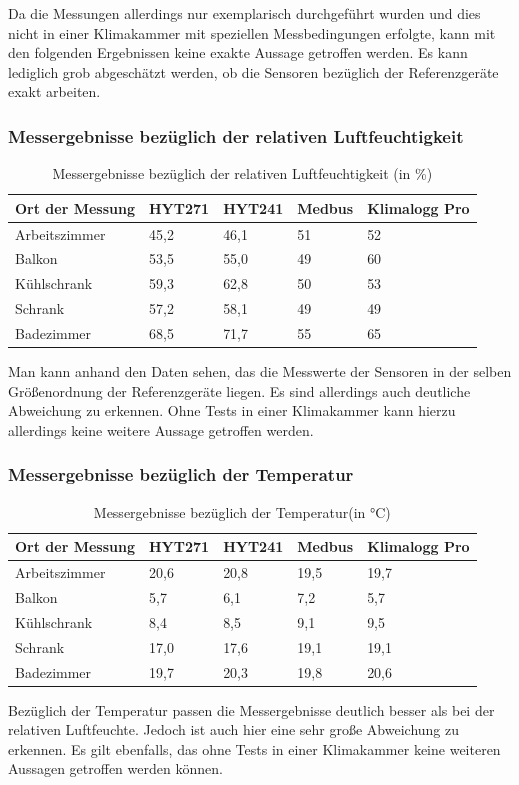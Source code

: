 		Da die Messungen allerdings nur exemplarisch durchgeführt wurden und dies nicht in einer Klimakammer mit speziellen Messbedingungen erfolgte, kann mit den folgenden Ergebnissen keine exakte Aussage getroffen werden. Es kann lediglich grob abgeschätzt werden, ob die Sensoren bezüglich der Referenzgeräte exakt arbeiten.
		\subsubsection{Messergebnisse bezüglich der relativen Luftfeuchtigkeit}
		
		\begin{table}[H]
			\centering
			\begin{tabular}{|l|l|l|l|l|}
				\hline \textbf{Ort der Messung} & \textbf{HYT271} & \textbf{HYT241} & \textbf{Medbus} & \textbf{Klimalogg Pro}\\
				\hline Arbeitszimmer & 45,2 & 46,1 & 51 & 52 \\
				\hline Balkon & 53,5 & 55,0 & 49 & 60 \\
				\hline Kühlschrank & 59,3 & 62,8 & 50 & 53 \\
				\hline Schrank & 57,2 & 58,1 & 49 & 49 \\
				\hline Badezimmer & 68,5 & 71,7 & 55 & 65 \\
				\hline 
			\end{tabular}
			\caption{Messergebnisse bezüglich der relativen Luftfeuchtigkeit (in \%)}
			\label{table:HYTHumid}
		\end{table}
		
		Man kann anhand den Daten sehen, das die Messwerte der Sensoren in der selben Größenordnung der Referenzgeräte liegen. Es sind allerdings auch deutliche Abweichung zu erkennen. Ohne Tests in einer Klimakammer kann hierzu allerdings keine weitere Aussage getroffen werden.
		
		\subsubsection{Messergebnisse bezüglich der Temperatur}
		
		\begin{table}[H]
			\centering
			\begin{tabular}{|l|l|l|l|l|}
				\hline \textbf{Ort der Messung} & \textbf{HYT271} & \textbf{HYT241} & \textbf{Medbus} & \textbf{Klimalogg Pro}\\
				\hline Arbeitszimmer & 20,6 & 20,8 & 19,5 & 19,7 \\
				\hline Balkon & 5,7 & 6,1 & 7,2 & 5,7 \\
				\hline Kühlschrank & 8,4 & 8,5 & 9,1 & 9,5 \\
				\hline Schrank & 17,0 & 17,6 & 19,1 & 19,1 \\
				\hline Badezimmer & 19,7 & 20,3 & 19,8 & 20,6 \\
				\hline
			\end{tabular}
			\caption{Messergebnisse bezüglich der Temperatur(in °C)}
			\label{table:HYTTemp}
		\end{table}
		
		Bezüglich der Temperatur passen die Messergebnisse deutlich besser als bei der relativen Luftfeuchte. Jedoch ist auch hier eine sehr große Abweichung zu erkennen. Es gilt ebenfalls, das ohne Tests in einer Klimakammer keine weiteren Aussagen getroffen werden können.